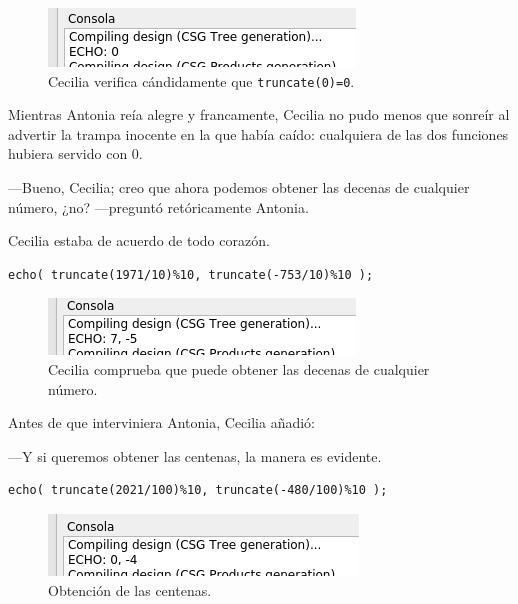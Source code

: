 \begin{figure}[ht]
  \centering
  \includegraphics[width=.6\textwidth]{imagenes/truncate-0}
  \caption{Cecilia verifica cándidamente que
    \lstinline!truncate(0)=0!.}
  \label{fig:truncate-0}
\end{figure}
  

Mientras Antonia reía alegre y francamente, Cecilia no pudo menos que
sonreír al advertir la trampa inocente en la que había caído:
cualquiera de las dos funciones hubiera servido con 0.

---Bueno, Cecilia; creo que ahora podemos obtener las decenas de
cualquier número, ¿no? ---preguntó retóricamente Antonia.

Cecilia estaba de acuerdo de todo corazón.

\begin{lstlisting}[numbers=none]
echo( truncate(1971/10)%10, truncate(-753/10)%10 );
\end{lstlisting}

\begin{figure}[ht]
  \centering
  \includegraphics[width=.6\textwidth]{imagenes/decenas-bien}
  \caption{Cecilia comprueba que puede obtener las decenas de
    cualquier número.}
  \label{fig:decenas-bien}
\end{figure}
  

Antes de que interviniera Antonia, Cecilia añadió:

---Y si queremos obtener las centenas, la manera es evidente.

\begin{lstlisting}[numbers=none]
echo( truncate(2021/100)%10, truncate(-480/100)%10 );
\end{lstlisting}

\begin{figure}[ht]
  \centering
\includegraphics[width=.6\textwidth]{imagenes/centenas}  
  \caption{Obtención de las centenas.}
  \label{fig:centenas}
\end{figure}


